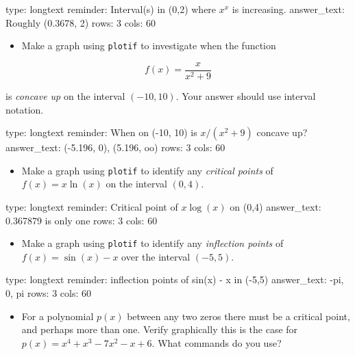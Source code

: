 \documentclass[12pt]{article}
\begin{document}
\begin{answer}
type: longtext
reminder: Interval(s) in (0,2) where \( x^x \) is increasing.
answer_text: Roughly (0.3678, 2) 
rows: 3
cols: 60
\end{answer}

\begin{itemize}
\itemsep1pt\parskip0pt
\item
  Make a graph using \texttt{plotif} to investigate when the function
\end{itemize}

\[
f(x) = \frac{x}{x^2+9}
\]

is \emph{concave up} on the interval $(-10,10)$. Your answer should use
interval notation.

\begin{answer}
type: longtext
reminder: When on (-10, 10) is \( x/(x^2 + 9) \) concave up?
answer_text: (-5.196, 0), (5.196, oo) 
rows: 3
cols: 60
\end{answer}

\begin{itemize}
\itemsep1pt\parskip0pt
\item
  Make a graph using \texttt{plotif} to identify any \emph{critical
  points} of $f(x) = x \ln(x)$ on the interval $(0,4)$.
\end{itemize}

\begin{answer}
type: longtext
reminder: Critical point of \( x \log(x) \) on (0,4)
answer_text: 0.367879 is only one 
rows: 3
cols: 60
\end{answer}

\begin{itemize}
\itemsep1pt\parskip0pt
\item
  Make a graph using \texttt{plotif} to identify any \emph{inflection
  points} of $f(x) = \sin(x) - x$ over the interval $(-5,5)$.
\end{itemize}

\begin{answer}
type: longtext
reminder: inflection points of sin(x) - x in (-5,5)
answer_text: -pi, 0, pi 
rows: 3
cols: 60
\end{answer}

\begin{itemize}
\itemsep1pt\parskip0pt
\item
  For a polynomial $p(x)$ between any two zeros there must be a critical
  point, and perhaps more than one. Verify graphically this is the case
  for $p(x) =x^4 + x^3 - 7x^2 - x + 6$. What commands do you use?
\end{itemize}
\end{document}
